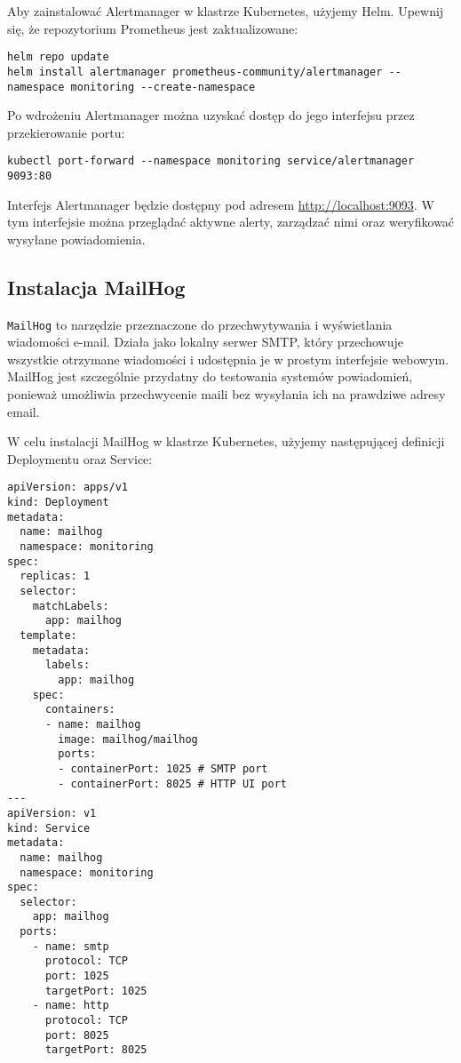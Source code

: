 \documentclass{article}
\begin{document}
Aby zainstalować Alertmanager w klastrze Kubernetes, użyjemy Helm. Upewnij się, że repozytorium Prometheus jest zaktualizowane:

\begin{lstlisting}
helm repo update
helm install alertmanager prometheus-community/alertmanager --namespace monitoring --create-namespace
\end{lstlisting}

Po wdrożeniu Alertmanager można uzyskać dostęp do jego interfejsu przez przekierowanie portu:

\begin{lstlisting}
kubectl port-forward --namespace monitoring service/alertmanager 9093:80
\end{lstlisting}

Interfejs Alertmanager będzie dostępny pod adresem \url{http://localhost:9093}. W tym interfejsie można przeglądać aktywne alerty, zarządzać nimi oraz weryfikować wysyłane powiadomienia.

\subsection{Instalacja MailHog}

\texttt{MailHog} to narzędzie przeznaczone do przechwytywania i wyświetlania wiadomości e-mail. Działa jako lokalny serwer SMTP, który przechowuje wszystkie otrzymane wiadomości i udostępnia je w prostym interfejsie webowym. MailHog jest szczególnie przydatny do testowania systemów powiadomień, ponieważ umożliwia przechwycenie maili bez wysyłania ich na prawdziwe adresy email.

W celu instalacji MailHog w klastrze Kubernetes, użyjemy następującej definicji Deploymentu oraz Service:

\begin{lstlisting}
apiVersion: apps/v1
kind: Deployment
metadata:
  name: mailhog
  namespace: monitoring
spec:
  replicas: 1
  selector:
    matchLabels:
      app: mailhog
  template:
    metadata:
      labels:
        app: mailhog
    spec:
      containers:
      - name: mailhog
        image: mailhog/mailhog
        ports:
        - containerPort: 1025 # SMTP port
        - containerPort: 8025 # HTTP UI port
---
apiVersion: v1
kind: Service
metadata:
  name: mailhog
  namespace: monitoring
spec:
  selector:
    app: mailhog
  ports:
    - name: smtp
      protocol: TCP
      port: 1025
      targetPort: 1025
    - name: http
      protocol: TCP
      port: 8025
      targetPort: 8025
\end{lstlisting}
\end{document}
